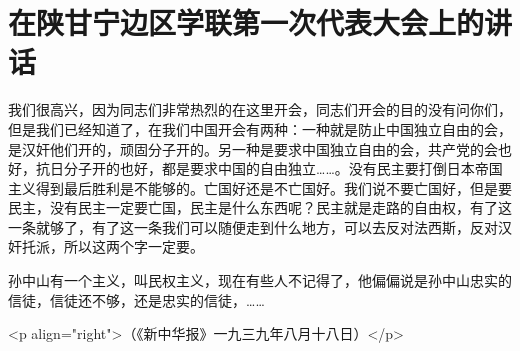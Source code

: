 \section[在陕甘宁边区学联第一次代表大会上的讲话（一九三九年八月十三日）]{在陕甘宁边区学联第一次代表大会上的讲话}


我们很高兴，因为同志们非常热烈的在这里开会，同志们开会的目的没有问你们，但是我们已经知道了，在我们中国开会有两种：一种就是防止中国独立自由的会，是汉奸他们开的，顽固分子开的。另一种是要求中国独立自由的会，共产党的会也好，抗日分子开的也好，都是要求中国的自由独立……。没有民主要打倒日本帝国主义得到最后胜利是不能够的。亡国好还是不亡国好。我们说不要亡国好，但是要民主，没有民主一定要亡国，民主是什么东西呢？民主就是走路的自由权，有了这一条就够了，有了这一条我们可以随便走到什么地方，可以去反对法西斯，反对汉奸托派，所以这两个字一定要。

孙中山有一个主义，叫民权主义，现在有些人不记得了，他偏偏说是孙中山忠实的信徒，信徒还不够，还是忠实的信徒，……

<p align="right">（《新中华报》一九三九年八月十八日）</p>

